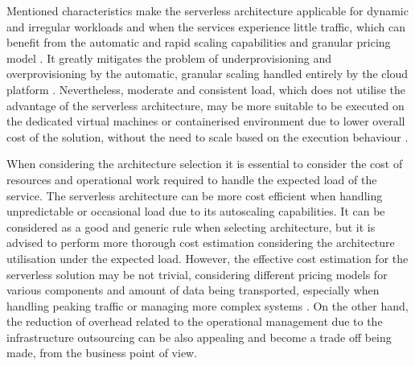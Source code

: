 Mentioned characteristics make the serverless architecture applicable for dynamic and irregular workloads and when the services experience little traffic, which can benefit from the automatic and rapid scaling capabilities and granular pricing model \cite{EvaluationOfServerlessApplicationProgrammingModel}.
It greatly mitigates the problem of underprovisioning and overprovisioning by the automatic, granular scaling handled entirely by the cloud platform \cite{MartinFowlerServerless}.
Nevertheless, moderate and consistent load, which does not utilise the advantage of the serverless architecture, may be more suitable to be executed on the dedicated virtual machines or containerised environment due to lower overall cost of the solution, without the need to scale based on the execution behaviour \cite{LeveragingServerlessCloudComputingArchitectures}.

When considering the architecture selection it is essential to consider the cost of resources and operational work required to handle the expected load of the service.
The serverless architecture can be more cost efficient when handling unpredictable or occasional load due to its autoscaling capabilities. It can be considered as a good and generic rule when selecting architecture, but it is advised to perform more thorough cost estimation considering the architecture utilisation under the expected load.
However, the effective cost estimation for the serverless solution may be not trivial, considering different pricing models for various components and amount of data being transported, especially when handling peaking traffic or managing more complex systems \cite{EvaluationOfServerlessApplicationProgrammingModel}.
On the other hand, the reduction of overhead related to the operational management due to the infrastructure outsourcing can be also appealing and become a trade off being made, from the business point of view.




